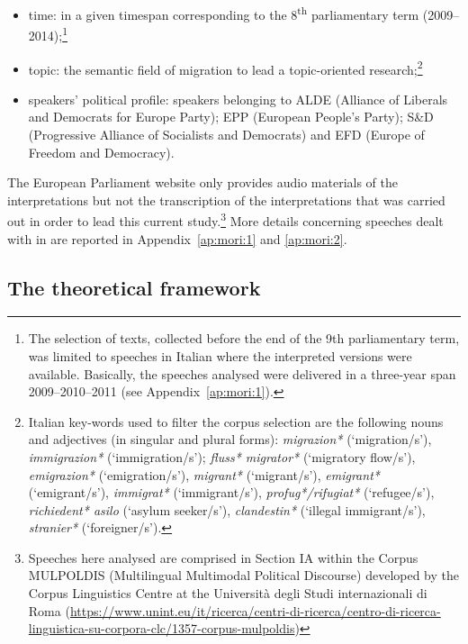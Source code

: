 \documentclass[output=paper]{langscibook}
\begin{document}
\begin{itemize}
\item
time: in a given timespan corresponding to the 8\textsuperscript{th} parliamentary term (2009--2014);\footnote{The selection of texts, collected before the end of the 9th parliamentary term, was limited to speeches in Italian where the interpreted versions were available. Basically, the speeches analysed were delivered in a three-year span 2009--2010--2011 (see Appendix~\ref{ap:mori:1}).}
\item
topic: the semantic field of migration to lead a topic-oriented research;\footnote{Italian key-words used to filter the corpus selection are the following nouns and adjectives (in singular and plural forms): \textit{migrazion*} (‘migration/s’), \textit{immigrazion*} (‘immigration/s’); \textit{fluss* migrator*} (‘migratory flow/s’), \textit{emigrazion*} (‘emigration/s’), \textit{migrant*} (‘migrant/s’), \textit{emigrant*} (‘emigrant/s’), \textit{immigrat*} (‘immigrant/s’), \textit{profug*/rifugiat*} (‘refugee/s’), \textit{richiedent* asilo} (‘asylum seeker/s’), \textit{clandestin*} (‘illegal immigrant/s’), \textit{stranier*} (‘foreigner/s’).}
\item
speakers’ political profile: speakers belonging to ALDE (Alliance of Liberals and Democrats for Europe Party); EPP (European People’s Party); S\&D (Progressive Alliance of Socialists and Democrats) and EFD (Europe of Freedom and Democracy). 
\end{itemize}

The European Parliament website only provides audio materials of the interpretations but not the transcription of the interpretations that was carried out in order to lead this current study.\footnote{Speeches here analysed are comprised in Section IA within the Corpus MULPOLDIS (Multilingual Multimodal Political Discourse) developed by the Corpus Linguistics Centre at the Università degli Studi internazionali di Roma (\url{https://www.unint.eu/it/ricerca/centri-di-ricerca/centro-di-ricerca-linguistica-su-corpora-clc/1357-corpus-mulpoldis})} More details concerning speeches dealt with in  are reported in Appendix~\ref{ap:mori:1} and \ref{ap:mori:2}.


\subsection{The theoretical framework}\label{sec:mori:3.3}
\end{document}
